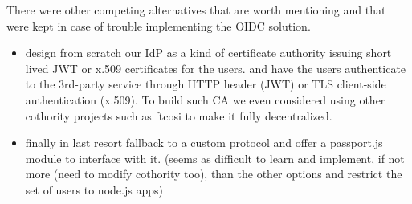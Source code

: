     There were other competing alternatives that are worth mentioning and that were kept in case of trouble implementing the OIDC solution.
    \begin{itemize}
        \item design from scratch our IdP as a kind of certificate authority issuing short lived JWT or x.509 certificates for the users.
                and have the users authenticate to the 3rd-party service through HTTP header (JWT) or TLS client-side authentication (x.509).
                To build such CA we even considered using other cothority projects such as ftcosi to make it fully decentralized.
        \item finally in last resort fallback to a custom protocol and offer a passport.js module to interface with it.
                (seems as difficult to learn and implement, if not more (need to modify cothority too), than the other options and restrict the set of users to node.js apps)
    \end{itemize}




%
%
%





















